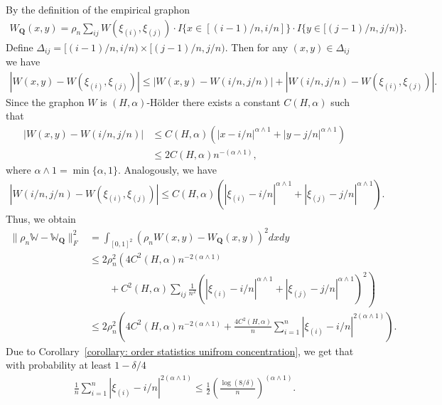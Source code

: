 \documentclass[11pt]{article}
\newcommand{\bQ}{\bm{Q}}
\newcommand{\bbW}{\mathbb{W}}
\newcommand{\<}{\langle}
\renewcommand{\>}{\rangle}
\theoremstyle{plain}
\theoremstyle{definition}
\theoremstyle{remark}
\begin{document}
{By the definition of the empirical graphon 
\begin{align*}
	W_{\bQ}(x,y) = \rho_n\sum_{i j} W(\xi_{(i)}, \xi_{(j)}) \cdot I\{x \in [(i - 1)/n, i/n]\} \cdot I\{y \in [(j - 1)/n, j/n)\}.
\end{align*}
Define $\Delta_{ij} = [(i-1)/n, i/n) \times [(j - 1)/n, j/n)$. Then for any $(x, y) \in \Delta_{ij}$ we have
\begin{align*}
	|W(x, y) - W(\xi_{(i)}, \xi_{(j)})| \le \left |W(x, y) - W \left ( i/n, j/n \right ) \right | + \left |  W \left ( i/n, j/n \right ) - W(\xi_{(i)}, \xi_{(j)})\right |.
\end{align*}
Since the graphon $W$ is $(H, \alpha)$-H\"older there exists a constant $C(H, \alpha)$ such that
\begin{align*}
	\left |W(x, y) - W \left ( i/n, j/n \right ) \right | & \le C(H, \alpha) \left ( |x - i/n|^{\alpha \land 1} + |y - j/n|^{\alpha \land 1} \right ) \\
	& \le 2 C(H, \alpha) n^{-(\alpha \land 1)},
\end{align*}
where $\alpha \land 1=\min\{\alpha,1\}.$
Analogously, we have
\begin{align*}
	\left |  W \left ( i/n, j/n \right ) - W(\xi_{(i)}, \xi_{(j)})\right | \le C(H, \alpha) \left (|\xi_{(i)} - i/n|^{\alpha \land 1} +  |\xi_{(j)} - j/n|^{\alpha \land 1}\right ).
\end{align*}
Thus, we obtain
\begin{align}
    \|\rho_n \bbW - \bbW_{\bQ}\|_F^2 &= \int_{[0, 1]^2} (\rho_n W(x, y) - W_{\bQ}(x, y))^2 dx dy \nonumber \\
    & \le 2\rho_n^2 \left(4 C^2(H, \alpha) n^{-2 (\alpha \land 1)} \nonumber\right. \\
	&\left. \quad \quad + C^2(H, \alpha) \sum_{i j} \frac{1}{n^2} \left (|\xi_{(i)} - i/n|^{\alpha \land 1} +  |\xi_{(j)} - j/n|^{\alpha \land 1}\right )^2\right) \nonumber \\
	& \le 2\rho_n^2 \left(4 C^2(H, \alpha) n^{-2 (\alpha \wedge 1)} + \frac{4 C^2(H, \alpha)}{n} \sum_{i = 1}^n |\xi_{(i)} - i/n|^{2 (\alpha \wedge 1)}\right). \label{eq: L2 decomposition for Holder graphon}
\end{align}
Due to Corollary~\ref{corollary: order statistics unifrom concentration}, we get that with probability at least $1 - \delta/4$
\begin{align*}
	\frac{1}{n} \sum_{i = 1}^n \left | \xi_{(i)} - i/n \right |^{2 (\alpha \wedge 1)}  \le \frac{1}{2} \left ( \frac{\log (8/\delta)}{n} \right )^{(\alpha \wedge 1)}.

\end{align*}}
\end{document}
